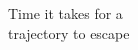 \documentclass[preview]{standalone}
\begin{document}
Time it takes for a\\trajectory to escape\\
\end{document}
